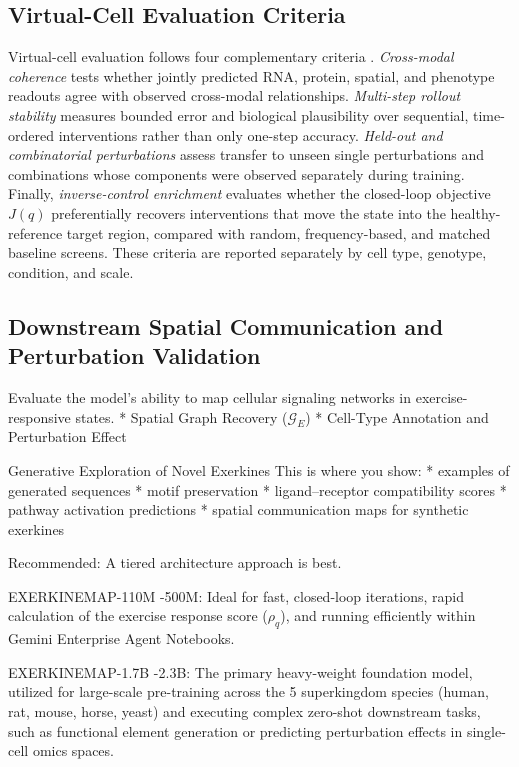 \documentclass[11pt]{article}
\begin{document}
\subsection{Virtual-Cell Evaluation Criteria}
Virtual-cell evaluation follows four complementary criteria \cite{xing2026}. \textit{Cross-modal coherence} tests whether jointly predicted RNA, protein, spatial, and phenotype readouts agree with observed cross-modal relationships. \textit{Multi-step rollout stability} measures bounded error and biological plausibility over sequential, time-ordered interventions rather than only one-step accuracy. \textit{Held-out and combinatorial perturbations} assess transfer to unseen single perturbations and combinations whose components were observed separately during training. Finally, \textit{inverse-control enrichment} evaluates whether the closed-loop objective $J(q)$ preferentially recovers interventions that move the state into the healthy-reference target region, compared with random, frequency-based, and matched baseline screens. These criteria are reported separately by cell type, genotype, condition, and scale.

\subsection{Downstream Spatial Communication and Perturbation Validation}
Evaluate the model's ability to map cellular signaling networks in exercise-responsive states.
* Spatial Graph Recovery ($\mathcal{G}_E$)
* Cell-Type Annotation and Perturbation Effect

Generative Exploration of Novel Exerkines
This is where you show:
* examples of generated sequences
* motif preservation
* ligand–receptor compatibility scores
* pathway activation predictions
* spatial communication maps for synthetic exerkines

Recommended: A tiered architecture approach is best. 

EXERKINEMAP-110M -500M: Ideal for fast, closed-loop iterations, rapid calculation of the exercise response score ($\rho_q$), and running efficiently within Gemini Enterprise Agent Notebooks. 

EXERKINEMAP-1.7B -2.3B: The primary heavy-weight foundation model, utilized for large-scale pre-training across the 5 superkingdom species (human, rat, mouse, horse, yeast) and executing complex zero-shot downstream tasks, such as functional element generation or predicting perturbation effects in single-cell omics spaces.
\end{document}
